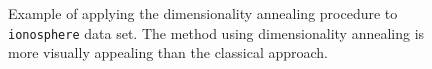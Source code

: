 \begin{figure}
		 \centering
			    \hspace{0.02\textwidth}
		\caption{Example of applying the dimensionality annealing procedure to \texttt{ionosphere} data set. The method using dimensionality annealing is more visually appealing than the classical approach.}
		\label{fig:simulated-annealing}
	\end{figure}
